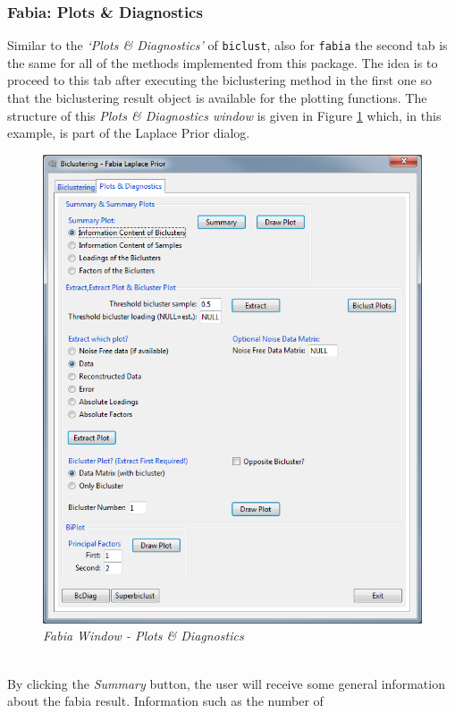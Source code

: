 \documentclass[a4paper]{article}\usepackage[]{graphicx}\usepackage[]{color}
\begin{document}
\subsubsection{Fabia: Plots \& Diagnostics}
Similar to the {\it `Plots \& Diagnostics'} of \verb|biclust|, also for
\verb|fabia| the second tab is the same for all of the methods implemented from
this package. The idea is to proceed to this tab after executing the
biclustering method in the first one so that the biclustering result object is
available for the plotting functions. The structure of this {\it Plots \&
Diagnostics window} is given in Figure \ref{fabia_plotdiagtab} which, in this
example, is part of the Laplace Prior dialog.
\begin{figure}[H]
\centering
\includegraphics[scale=0.5]{figures/fabia_plotdiagtab.png}
\caption{{\it Fabia Window - Plots \& Diagnostics}\label{fabia_plotdiagtab}}
\end{figure}
\\
\noindent By clicking the {\it Summary} button, the user will receive some
general information about the fabia result. Information such as the number of
\end{document}
